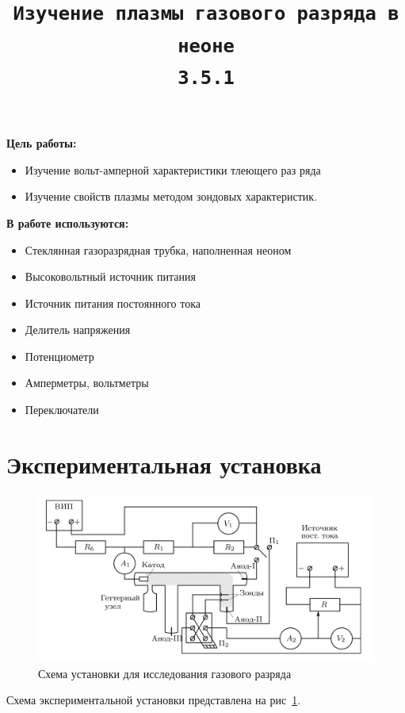 \documentclass[11pt,a4paper]{article}
\title{\texttt{Изучение плазмы газового разряда в неоне \\ 3.5.1}}
\author{}
\date{}
\begin{document}
  \maketitle

\textbf{Цель работы:}
\begin{itemize}
  \item  Изучение вольт-амперной характеристики тлеющего раз­
  ряда
  \item Изучение свойств плазмы методом зондовых характеристик.
\end{itemize}

\textbf{В работе используются:}  
\begin{itemize}
  \item Стеклянная газоразрядная трубка, наполнен­ная неоном
  \item Высоковольтный источник питания
  \item Источник питания посто­янного тока
  \item Делитель напряжения
  \item Потенциометр
  \item Амперметры, вольтметры
  \item Переключатели
\end{itemize}

\section*{Экспериментальная установка}

\begin{figure}[h!]
  \includegraphics*[width=\textwidth]{2023-09-02-00-10-53.png}
  \caption{Схема установки для исследования газового разряда}
  \label{fig:ust}
\end{figure}
\noindent Схема экспериментальной установки представлена на рис~\ref{fig:ust}.
  
\end{document}
